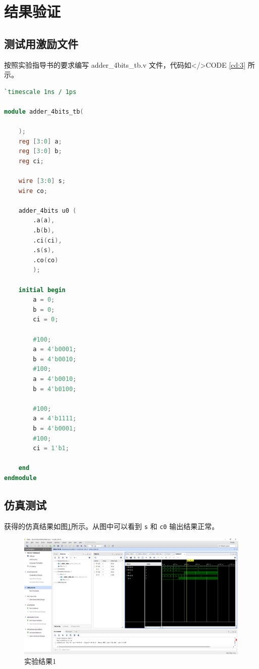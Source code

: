 \documentclass{progartcn}
\begin{document}
\section{结果验证}

\subsection{测试用激励文件}

按照实验指导书的要求编写 adder\_4bits\_tb.v 文件，代码如</>CODE \ref{cd:3} 所示。

\begin{lstlisting}[language=verilog,caption={adder\_4bits\_tb.v},label={cd:3}]
`timescale 1ns / 1ps

module adder_4bits_tb(

    );
    reg [3:0] a;
    reg [3:0] b;
    reg ci;
    
    wire [3:0] s;
    wire co;
    
    adder_4bits u0 (
        .a(a),
        .b(b),
        .ci(ci),
        .s(s),
        .co(co)
        );
    
    initial begin
        a = 0;
        b = 0;
        ci = 0;
        
        #100;
        a = 4'b0001;
        b = 4'b0010;
        #100;
        a = 4'b0010;
        b = 4'b0100;
        
        #100;
        a = 4'b1111;
        b = 4'b0001;
        #100;
        ci = 1'b1;
    
    end
endmodule
\end{lstlisting}

\subsection{仿真测试}

获得的仿真结果如图\ref{fig:1}所示。从图中可以看到 \verb|s| 和 \verb|c0| 输出结果正常。

\begin{figure}[htbp]
  \centering
  \includegraphics[scale=0.3]{../figure/02/lab02-1.PNG}
  \caption{实验结果1}\label{fig:1}
\end{figure}
\end{document}
